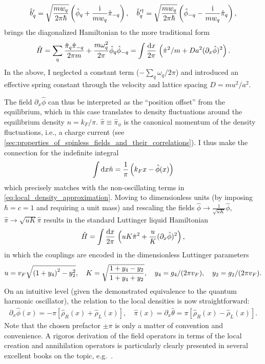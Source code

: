 \begin{align}
    \hat b'_q = \sqrt{\frac{mw_q}{2\pi\hbar}}\left( \hat\phi_q + \frac{\mathrm i}{mw_q}\hat\pi_{-q} \right),
    \quad
    \hat b'^\dag_q = \sqrt{\frac{mw_q}{2\pi\hbar}}\left( \hat\phi_{-q} - \frac{\mathrm i}{mw_q}\hat\pi_{q} \right),
\end{align}
brings the diagonalized Hamiltonian to the more traditional form
\begin{align}
    \hat H = \sum_q \frac{\hat\pi_q\hat\pi_{-q}}{2\pi m} + \frac{m\omega_q^2}{2\pi}\hat\phi_q\hat\phi_{-q}
    =
    \int\frac{\mathrm d x}{2\pi}\, \left( \hat\pi^2/m + {Da^2}(\partial_x\hat\phi)^2 \right).
\end{align}
In the above, I neglected a constant term ($-\sum_q\omega_q/2\pi$) and introduced an effective spring constant through the velocity and lattice spacing $D=mu^2/a^2$.

The field $\partial_x\hat\phi$ can thus be interpreted as the ``position offset'' from the equilibrium, which in this case translates to density fluctuations around the equilibrium density $n=k_F/\pi$.
$\hat\pi\equiv\hat\pi_\phi$ is the canonical momentum of the density fluctuations, i.e., a charge current (see \cref{sec:properties_of_spinless_fields_and_their_correlations}).
I thus make the connection for the indefinite integral
\begin{align}
    \int\mathrm d x\hat n = \frac1\pi\left( k_Fx - \hat\phi(x) \right)
\end{align}
which precisely matches with the non-oscillating terms in \cref{eq:local_density_approximation}.
Moving to dimensionless units (by imposing $\hbar=c=1$ and requiring a unit mass) and rescaling the fields $\hat\phi\rightarrow \frac1{\sqrt{uK}}\hat\phi$, $\hat\pi\rightarrow \sqrt{uK}\hat\pi$ results in the standard Luttinger liquid Hamiltonian
\begin{align}
    \hat H = \int\frac{\mathrm d x}{2\pi}\, \left( uK\hat\pi^2 + \frac uK(\partial_x\hat\phi)^2 \right),
    \label{eq:ll_hamiltonian}
\end{align}
in which the couplings are encoded in the dimensionless Luttinger parameters
\begin{align}
    u = v_F\sqrt{\left( 1 + y_4 \right)^2 - y_2^2},
    \quad
    K = \sqrt{\frac{1+y_4-y_2}{1+y_4+y_2}},
    \quad
    y_4=g_4/(2\pi v_F),
    \quad
    y_2=g_2/(2\pi v_F).
\end{align}
On an intuitive level (given the demonstrated equivalence to the quantum harmonic oscillator), the relation to the local densities is now straightforward:
\begin{align}
    \partial_x\hat\phi(x)=-\pi[\hat\rho_R(x)+\hat\rho_L(x)],
    \quad
    \hat\pi(x)=\partial_x\hat\theta=\pi[\hat\rho_R(x)-\hat\rho_L(x)].
\end{align}
Note that the chosen prefactor $\pm\pi$ is only a matter of convention and convenience.
A rigoros derivation of the field operators in terms of the local creation and annihilation operators is particularly clearly presented in several excellent books on the topic, e.g.~\cite{Bruus2004,Giamarchi2003,Gogolin2004}.

